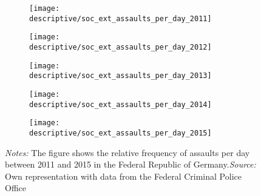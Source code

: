 \documentclass[11pt, a4paper]{article} %
\begin{document}
\renewcommand\thefigure{A\arabic{figure}}
\setcounter{figure}{0} 
\captionsetup[subfigure]{labelformat=parens}



\vspace*{\fill}
\begin{figure}[H]\centering
	\caption{Distribution of assaults across days of the year, per year}\label{fig_soc_ext:assault_year_distribution}
	\begin{subfigure}[h]{0.48\linewidth}\centering
		\texttt{[image: descriptive/soc\_ext\_assaults\_per\_day\_2011]}
	\end{subfigure}
	\begin{subfigure}[h]{0.48\linewidth}\centering
		\texttt{[image: descriptive/soc\_ext\_assaults\_per\_day\_2012]}
	\end{subfigure}\begin{subfigure}[h]{0.48\linewidth}\centering
		\texttt{[image: descriptive/soc\_ext\_assaults\_per\_day\_2013]}
	\end{subfigure}
	\begin{subfigure}[h]{0.48\linewidth}\centering
		\texttt{[image: descriptive/soc\_ext\_assaults\_per\_day\_2014]}
	\end{subfigure}
	\begin{subfigure}[h]{0.48\linewidth}\centering
		\texttt{[image: descriptive/soc\_ext\_assaults\_per\_day\_2015]}
	\end{subfigure}
	\begin{minipage}{\linewidth}
		\scriptsize{\emph{Notes:} The figure shows the relative frequency of assaults per day between 2011 and 2015 in the Federal Republic of Germany.\newline \emph{Source:} Own representation with data from the Federal Criminal Police Office}
	\end{minipage}
\end{figure}
\vspace*{\fill}\clearpage
\end{document}
